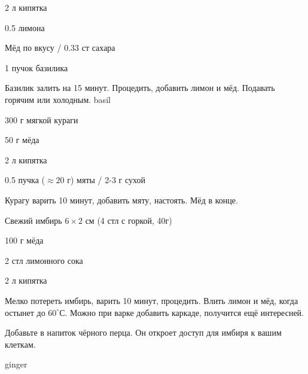 {
\item 2 л кипятка
\item 0.5 лимона 
\item Мёд по вкусу / 0.33 ст сахара
}{
\item 1 пучок базилика
}{
Базилик залить на 15 минут. Процедить, добавить лимон и мёд. Подавать горячим или холодным.
}{}{basil}





{
\item 300 г мягкой кураги
\item 50 г мёда
\item 2 л кипятка
}{
\item 0.5 пучка ($\approx 20$ г) мяты  / 2-3 г сухой
}{
Курагу варить 10 минут, добавить мяту, настоять. Мёд в конце.
}{}{}




{
\item Свежий имбирь $6\times 2$ см (4 стл с горкой, 40г)
\item 100 г мёда
\item 2 стл лимонного сока
\item 2 л кипятка
}{
\item[] 
}{
Мелко потереть имбирь, варить 10 минут, процедить. Влить лимон и мёд, когда остынет до $60^{\circ}$С. Можно при варке добавить каркаде, получится ещё интересней.

}{
\begin{advice}
\item Добавьте в напиток чёрного перца. Он откроет доступ для имбиря к вашим клеткам.
\end{advice}}{ginger}


% 
% 
% 
% 
